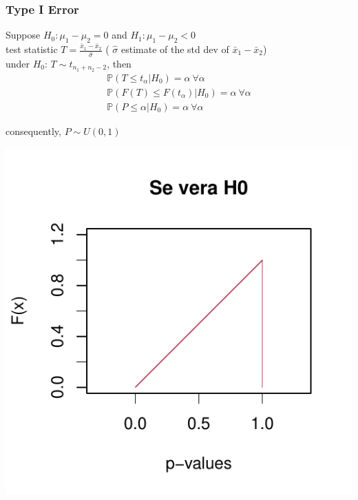 \documentclass[xcolor={pdftex,dvipsnames,table}]{beamer}
\begin{document}
\begin{frame}
\frametitle{Type I Error}

Suppose $H_0: \mu_1-\mu_2=0$ and $H_1: \mu_1-\mu_2<0$\\
test statistic $T=\frac{\bar{x}_1-\bar{x}_2}{\hat{\sigma}}$ ( $\hat{\sigma}$ estimate of the std dev of $\bar{x}_1-\bar{x}_2$)\\
under $H_0$: $T\sim t_{n_1+n_2-2}$, then
\begin{eqnarray*}
\mathbb{P}(T\leq t_\alpha | H_0) =\alpha \ \forall \alpha\\
\mathbb{P}(F(T)\leq F(t_\alpha) | H_0) =\alpha \ \forall \alpha\\
\mathbb{P}(P \leq \alpha | H_0) =\alpha \ \forall \alpha
\end{eqnarray*}
\vspace{-1.2cm}

\begin{minipage}{0.45\textwidth}
\centering
consequently, $P\sim U(0,1)$
\end{minipage}\hfill
\begin{minipage}{0.55\textwidth}
 \hspace{1cm} \includegraphics[width= \textwidth]{Slides/MTP/plaatjes/cdf_uniform}
\end{minipage}

\end{frame}
\end{document}
